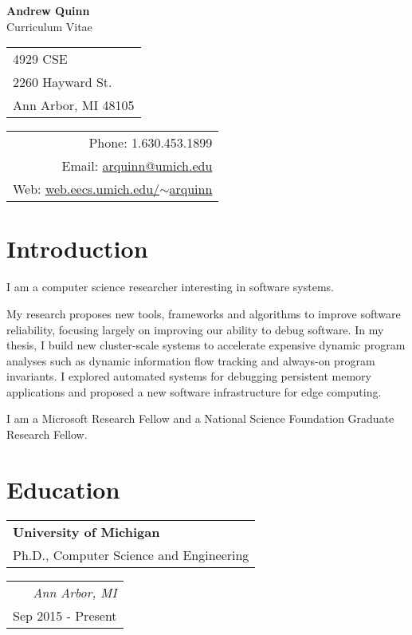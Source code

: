 \documentclass[letterpaper,10pt]{article}
\makeatletter
\def \name {Andrew Quinn}
\def \addr {4929 CSE\\2260 Hayward St.\\Ann Arbor, MI 48105}
\def \phone {1.630.453.1899}
\def \email {\href{mailto:arquinn@umich.edu}{arquinn@umich.edu}}
\def \website {\href{https://web.eecs.umich.edu/~arquinn}{web.eecs.umich.edu/$\sim$arquinn}}
\newcommand{\reitem}[2]{
  \begin{tabular}{l}
    #2
  \end{tabular}
\hfill
\begin{tabular}{r}
  #1
\end{tabular}
}
\newcommand{\quadItem}[4]{\reitem{\emph{#1}\\#2}{\textbf{#3}\\#4}}
\makeatother
\begin{document}
\begin{center}
  \textbf{{\LARGE \name}} \\
  Curriculum Vitae
\end{center}

\begin{tabular}{l}
  \addr
\end{tabular}
\hfill
\begin{tabular}{r}
  Phone: \phone\\
  Email: \email\\
  Web: \website
\end{tabular}




\section{Introduction}

I am a computer science researcher interesting in software systems.

My research proposes new tools, frameworks and algorithms to improve
software reliability, focusing largely on improving our ability to
debug software.  In my thesis, I build new cluster-scale systems to
accelerate expensive dynamic program analyses such as dynamic
information flow tracking and always-on program invariants.  I
explored automated systems for debugging persistent memory
applications and proposed a new software infrastructure for edge
computing.

I am a Microsoft Research Fellow and a National Science Foundation
Graduate Research Fellow.

\section{Education}

\quadItem{Ann Arbor, MI}{Sep 2015 - Present}{University of Michigan}{Ph.D., Computer Science and Engineering}
\end{document}
